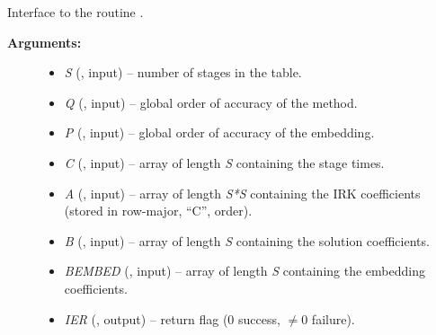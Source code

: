 \documentclass[letterpaper,10pt,english]{sphinxmanual}
\begin{document}
\begin{fulllineitems}
\label{f_interface/Usage:f/_/FARKSETIRKTABLE}
Interface to the routine {\hyperref[c_interface/User_callable:ARKodeSetIRKTable]{}}.
\begin{description}
\item[{\textbf{Arguments:}}] \leavevmode\begin{itemize}
\item {} 
\emph{S} (, input) -- number of stages in the table.

\item {} 
\emph{Q} (, input) -- global order of accuracy of the method.

\item {} 
\emph{P} (, input) -- global order of accuracy of the embedding.

\item {} 
\emph{C} (, input) -- array of length \emph{S} containing the stage times.

\item {} 
\emph{A} (, input) -- array of length \emph{S*S} containing the IRK coefficients
(stored in row-major, ``C'', order).

\item {} 
\emph{B} (, input) -- array of length \emph{S} containing the solution coefficients.

\item {} 
\emph{BEMBED} (, input) -- array of length \emph{S} containing the embedding
coefficients.

\item {} 
\emph{IER} (, output) -- return flag (0 success, $\ne 0$ failure).

\end{itemize}

\end{description}

\end{fulllineitems}

\end{document}
